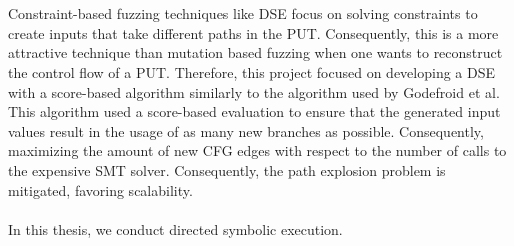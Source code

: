 \documentclass{kththesis}
\begin{document}
\\ \\
Constraint-based fuzzing techniques like DSE focus on solving constraints to create inputs that take different paths in the PUT. Consequently, this is a more attractive technique than mutation based fuzzing when one wants to reconstruct the control flow of a PUT. Therefore, this project focused on developing a DSE with a score-based algorithm similarly to the algorithm used by Godefroid et al\cite{automatedFuzzing}. This algorithm used a score-based evaluation to ensure that the generated input values result in the usage of as many new branches as possible. Consequently, maximizing the amount of new CFG edges with respect to the number of calls to the expensive SMT solver\cite{automatedFuzzing}. Consequently, the path explosion problem is mitigated, favoring scalability.
\\ \\
In this thesis, we conduct directed symbolic execution.



\end{document}
